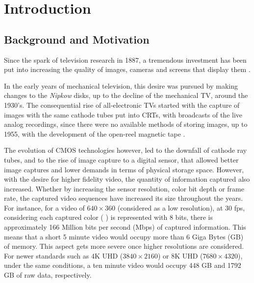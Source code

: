 \cleardoublepage
{}
\chapter{Introduction}

\section{Background and Motivation}


Since the spark of television research in 1887, a tremendous investment has been put into increasing the quality of images, cameras and screens that display them \cite{schubinWhatSparkedVideo2017}.

In the early years of mechanical television, this desire was pursued by making changes to the \textit{Nipkow} disks, up to the decline of the mechanical TV, around the 1930's. The consequential rise of all-electronic TVs started with the capture of images with the same cathode tubes put into \glspl{CRT}, with broadcasts of the live analog recordings, since there were no available methods of storing images, up to 1955, with the development of the open-reel magnetic tape \cite{jacobsBriefHistoryVideo}.

The evolution of \Gls{CMOS} technologies however, led to the downfall of cathode ray tubes, and to the rise of image capture to a digital sensor, that allowed better image captures and lower demands in terms of physical storage space. However, with the desire for higher fidelity video, the quantity of information captured also increased. Whether by increasing the sensor resolution, color bit depth or frame rate, the captured video sequences have increased its size throughout the years. For instance, for a video of $640 \times 360$ (considered as a low resolution), at 30 \gls{fps}, considering each captured color (
) is represented with 8 bits, there is approximately 166 Million bits per second (Mbps) of captured information. This means that a short 5 minute video would occupy more than 6 Giga Bytes (GB) of memory. This aspect gets more severe once higher resolutions are considered. For newer standards such as 4K \Gls{UHD} ($3840 \times 2160$) or 8K UHD ($ 7680 \times 4320$), under the same conditions, a ten minute video would occupy 448 GB and 1792 GB of raw data, respectively.

